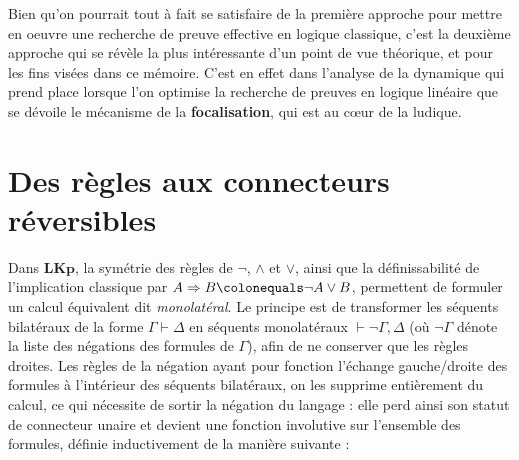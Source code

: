 \documentclass[12pt]{report}
\newcommand{\lto}{\Rightarrow}
\newcommand{\seq}{\vdash}
\newtheorem{definition}{Définition}
\begin{document}
Bien qu'on pourrait tout à fait se satisfaire de la première approche pour mettre en oeuvre une recherche de preuve effective en logique classique, c'est la deuxième approche qui se révèle la plus intéressante d'un point de vue théorique, et pour les fins visées dans ce mémoire. C'est en effet dans l'analyse de la dynamique qui prend place lorsque l'on optimise la recherche de preuves en logique linéaire que se dévoile le mécanisme de la \textbf{focalisation}, qui est au cœur de la ludique.

\section{Des règles aux connecteurs réversibles}



Dans $\mathbf{LKp}$, la symétrie des règles de $\neg$, $\land$ et $\lor$, ainsi que la définissabilité de l'implication classique par $A \lto B \colonequals \neg A \lor B$, permettent de formuler un calcul équivalent dit \emph{monolatéral}. Le principe est de transformer les séquents bilatéraux de la forme $\Gamma \seq \Delta$ en séquents monolatéraux $\seq \neg \Gamma,\Delta$ (où $\neg \Gamma$ dénote la liste des négations des formules de $\Gamma$), afin de ne conserver que les règles droites. Les règles de la négation ayant pour fonction l'échange gauche/droite des formules à l'intérieur des séquents bilatéraux, on les supprime entièrement du calcul, ce qui nécessite de sortir la négation du langage : elle perd ainsi son statut de connecteur unaire et devient une fonction involutive sur l'ensemble des formules, définie inductivement de la manière suivante :
\end{document}

